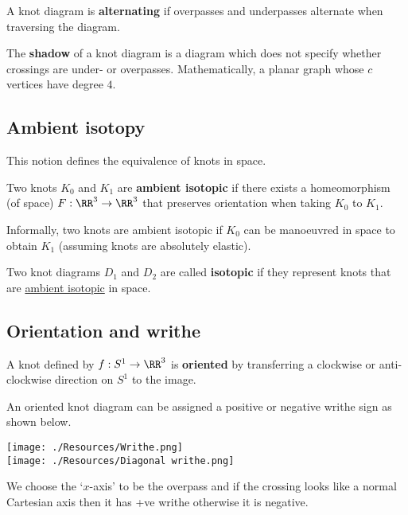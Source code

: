 \documentclass[12pt, a4paper]{article}
\begin{document}
\begin{definition}
    A knot diagram is \textbf{alternating} if overpasses and underpasses alternate when traversing the diagram.
\end{definition}

\begin{definition}
    The \textbf{shadow} of a knot diagram is a diagram which does not specify whether crossings are under- or overpasses. Mathematically, a planar graph whose \(c\) vertices have degree \(4\).
\end{definition}

\subsection{Ambient isotopy}

This notion defines the equivalence of knots in space.

\begin{definition}
    Two knots \(K_0\) and \(K_1\) are \textbf{ambient isotopic} if there exists a homeomorphism (of space) \(F : \RR^3 \to \RR^3\) that preserves orientation when taking \(K_0\) to \(K_1\).
\end{definition}

\begin{mdnote}
    Informally, two knots are ambient isotopic if \(K_0\) can be manoeuvred in space to obtain \(K_1\) (assuming knots are absolutely elastic).
\end{mdnote}

\begin{definition}
    Two knot diagrams \(D_1\) and \(D_2\) are called \textbf{isotopic} if they represent knots that are \underline{ambient isotopic} in space.
\end{definition}

\subsection{Orientation and writhe}

\begin{definition}
    A knot defined by \(f:S^1 \to \RR^3\) is \textbf{oriented} by transferring a clockwise or anti-clockwise direction on \(S^1\) to the image.
\end{definition}

\begin{mdprop}
    An oriented knot diagram can be assigned a positive or negative writhe sign as shown below. \\
    \begin{center}
        \texttt{[image: ./Resources/Writhe.png]} \\
        \texttt{[image: ./Resources/Diagonal writhe.png]} 
    \end{center}
    We choose the `\(x\)-axis' to be the overpass and if the crossing looks like a normal Cartesian axis then it has +ve writhe otherwise it is negative.
\end{mdprop}
\end{document}
